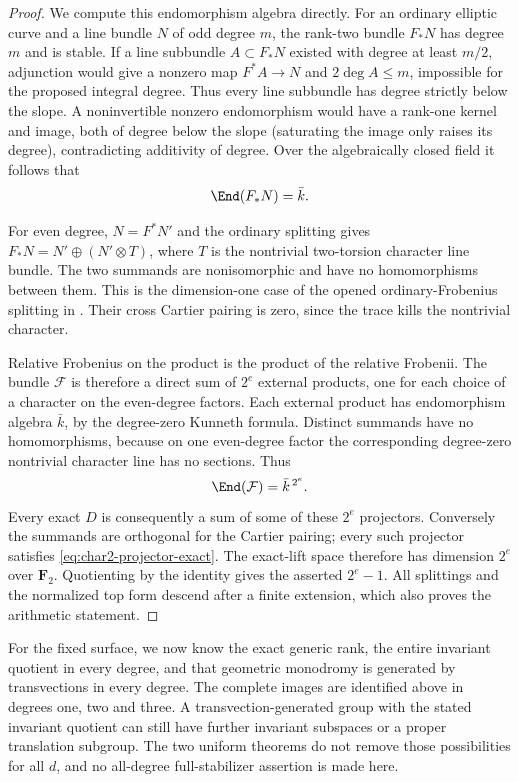\begin{proof}
We compute this endomorphism algebra directly.  For an ordinary
elliptic curve and a line bundle $N$ of odd degree $m$, the
rank-two bundle $F_*N$ has degree $m$ and is stable.
If a line subbundle $A\subset F_*N$ existed with degree at least
$m/2$, adjunction would give a nonzero map $F^*A\to N$ and
$2\deg A\le m$, impossible for the proposed integral degree.
Thus every line subbundle has degree strictly below the slope.
A noninvertible nonzero endomorphism would have a rank-one
kernel and image, both of degree below the slope (saturating the
image only raises its degree), contradicting additivity of
degree.  Over the algebraically closed field it follows that
\[
                     \End(F_*N)=\bar k.
\]

For even degree, $N=F^*N'$ and the ordinary splitting gives
$F_*N=N'\oplus(N'\otimes T)$, where $T$ is the nontrivial
two-torsion character line bundle.  The two summands are
nonisomorphic and have no homomorphisms between them.
This is the dimension-one case of the opened ordinary-Frobenius
splitting in \cite[Lemma~4.5, p.~11]{SannaiTanaka2016}.
Their cross Cartier pairing is zero, since the trace kills the
nontrivial character.

Relative Frobenius on the product is the product of the relative
Frobenii.  The bundle $\mathcal F$ is therefore a direct sum of
$2^e$ external products, one for each choice of a character on
the even-degree factors.  Each external product has endomorphism
algebra $\bar k$, by the degree-zero Kunneth formula.  Distinct
summands have no homomorphisms, because on one even-degree factor
the corresponding degree-zero nontrivial character line has no
sections.  Thus
\[
                      \End(\mathcal F)=\bar k^{\,2^e}.
\]
Every exact $D$ is consequently a sum of some of these $2^e$
projectors.  Conversely the summands are orthogonal for the
Cartier pairing; every such projector satisfies
\eqref{eq:char2-projector-exact}.  The exact-lift space therefore
has dimension $2^e$ over $\mathbf F_2$.
Quotienting by the identity gives the asserted $2^e-1$.
All splittings and the normalized top form descend after a
finite extension, which also proves the arithmetic statement.
\end{proof}

\begin{remark}
For the fixed surface, we now know the exact generic rank, the
entire invariant quotient in every degree, and that geometric
monodromy is generated by transvections in every degree.
The complete images are identified above in degrees one, two
and three.  A transvection-generated group with the stated
invariant quotient can still have further invariant subspaces
or a proper translation subgroup.  The two uniform theorems do
not remove those possibilities for all $d$, and no all-degree
full-stabilizer assertion is made here.
\end{remark}
